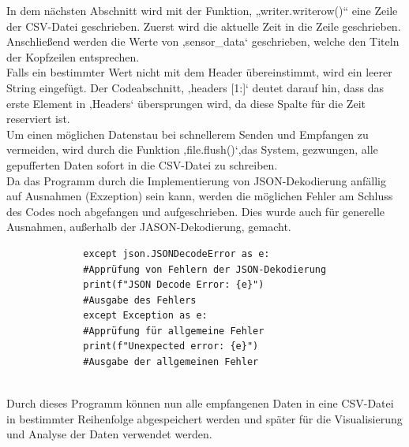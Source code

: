 \vspace{3mm}
In dem nächsten Abschnitt wird mit der Funktion, „writer.writerow()“ eine Zeile der CSV-Datei geschrieben.  Zuerst wird die aktuelle Zeit in die Zeile geschrieben. Anschließend werden die Werte von ‚sensor\_data‘ geschrieben, welche den Titeln der Kopfzeilen entsprechen. \\
\vspace{3mm}
Falls ein bestimmter Wert nicht mit dem Header übereinstimmt, wird ein leerer String eingefügt. Der Codeabschnitt, ‚headers [1:]‘ deutet darauf hin, dass das erste Element in ‚Headers‘ übersprungen wird, da diese Spalte für die Zeit reserviert ist.\\
\vspace{3mm}
Um einen möglichen Datenstau bei schnellerem Senden und Empfangen zu vermeiden, wird durch die Funktion ‚file.flush()‘,das System, gezwungen, alle gepufferten Daten sofort in die CSV-Datei zu schreiben. \\
\vspace{3mm}
Da das Programm durch die Implementierung von JSON-Dekodierung anfällig auf Ausnahmen (Exzeption) sein kann, werden die möglichen Fehler am Schluss des Codes noch abgefangen und aufgeschrieben. Dies wurde auch für generelle Ausnahmen, außerhalb der JASON-Dekodierung, gemacht. 
\vspace{3mm} 
\begin{figure}[H]
	\centering
	\begin{verbatim}
		except json.JSONDecodeError as e: 
		#Apprüfung von Fehlern der JSON-Dekodierung
		print(f"JSON Decode Error: {e}") 
		#Ausgabe des Fehlers 
		except Exception as e: 
		#Apprüfung für allgemeine Fehler
		print(f"Unexpected error: {e}") 
		#Ausgabe der allgemeinen Fehler
		
	\end{verbatim}
\end{figure}
Durch dieses Programm können nun alle empfangenen Daten in eine CSV-Datei in bestimmter Reihenfolge abgespeichert werden und später für die Visualisierung und Analyse der Daten verwendet werden.
\newpage
